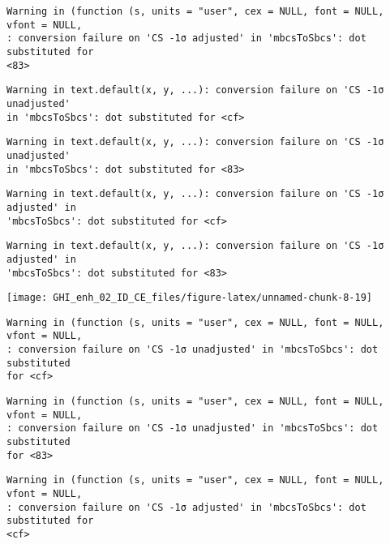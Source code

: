 \documentclass[
  10pt,
  a4paper,oneside]{article}
\begin{document}
\begin{verbatim}
Warning in (function (s, units = "user", cex = NULL, font = NULL, vfont = NULL,
: conversion failure on 'CS -1σ adjusted' in 'mbcsToSbcs': dot substituted for
<83>
\end{verbatim}

\begin{verbatim}
Warning in text.default(x, y, ...): conversion failure on 'CS -1σ unadjusted'
in 'mbcsToSbcs': dot substituted for <cf>
\end{verbatim}

\begin{verbatim}
Warning in text.default(x, y, ...): conversion failure on 'CS -1σ unadjusted'
in 'mbcsToSbcs': dot substituted for <83>
\end{verbatim}

\begin{verbatim}
Warning in text.default(x, y, ...): conversion failure on 'CS -1σ adjusted' in
'mbcsToSbcs': dot substituted for <cf>
\end{verbatim}

\begin{verbatim}
Warning in text.default(x, y, ...): conversion failure on 'CS -1σ adjusted' in
'mbcsToSbcs': dot substituted for <83>
\end{verbatim}

\begin{center}\texttt{[image: GHI\_enh\_02\_ID\_CE\_files/figure-latex/unnamed-chunk-8-19]} \end{center}

\begin{verbatim}
Warning in (function (s, units = "user", cex = NULL, font = NULL, vfont = NULL,
: conversion failure on 'CS -1σ unadjusted' in 'mbcsToSbcs': dot substituted
for <cf>
\end{verbatim}

\begin{verbatim}
Warning in (function (s, units = "user", cex = NULL, font = NULL, vfont = NULL,
: conversion failure on 'CS -1σ unadjusted' in 'mbcsToSbcs': dot substituted
for <83>
\end{verbatim}

\begin{verbatim}
Warning in (function (s, units = "user", cex = NULL, font = NULL, vfont = NULL,
: conversion failure on 'CS -1σ adjusted' in 'mbcsToSbcs': dot substituted for
<cf>
\end{verbatim}
\end{document}
